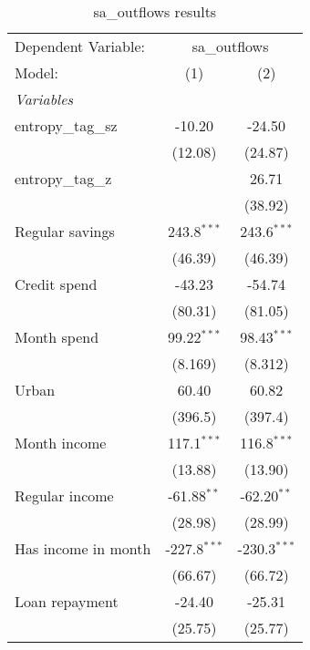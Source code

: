 
\begin{table}[htbp]
   \centering
   \footnotesize
   \begin{threeparttable}[b]
      \caption{\label{tab:reg_sa_outflows_full.tex} sa\_outflows results}
      \begin{tabular}{lcc}
         \tabularnewline \midrule \midrule
         Dependent Variable: & \multicolumn{2}{c}{sa\_outflows}\\
         Model:              & (1)            & (2)\\  
         \midrule
         \emph{Variables}\\
         entropy\_tag\_sz    & -10.20         & -24.50\\   
                             & (12.08)        & (24.87)\\   
         entropy\_tag\_z     &                & 26.71\\   
                             &                & (38.92)\\   
         Regular savings     & 243.8$^{***}$  & 243.6$^{***}$\\   
                             & (46.39)        & (46.39)\\   
         Credit spend        & -43.23         & -54.74\\   
                             & (80.31)        & (81.05)\\   
         Month spend         & 99.22$^{***}$  & 98.43$^{***}$\\   
                             & (8.169)        & (8.312)\\   
         Urban               & 60.40          & 60.82\\   
                             & (396.5)        & (397.4)\\   
         Month income        & 117.1$^{***}$  & 116.8$^{***}$\\   
                             & (13.88)        & (13.90)\\   
         Regular income      & -61.88$^{**}$  & -62.20$^{**}$\\   
                             & (28.98)        & (28.99)\\   
         Has income in month & -227.8$^{***}$ & -230.3$^{***}$\\   
                             & (66.67)        & (66.72)\\   
         Loan repayment      & -24.40         & -25.31\\   
                             & (25.75)        & (25.77)\\   

\end{tabular}
\end{threeparttable}
\end{table}
